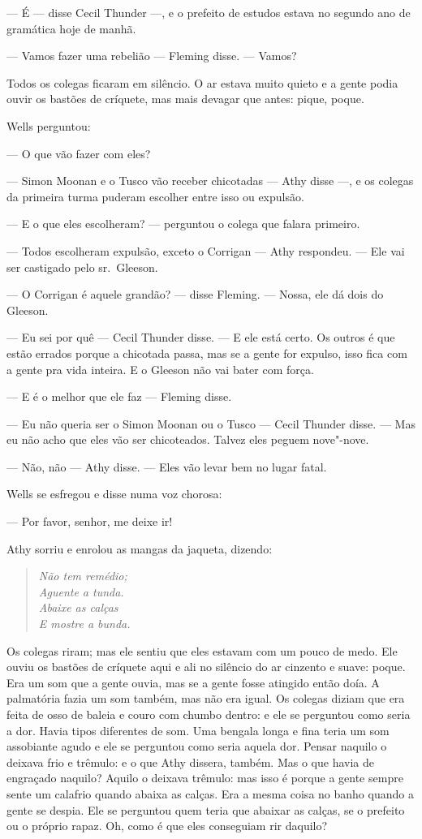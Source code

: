  --- É --- disse Cecil Thunder ---, e o prefeito de estudos estava no segundo ano
de gramática hoje de manhã.

 --- Vamos fazer uma rebelião --- Fleming disse. --- Vamos?

Todos os colegas ficaram em silêncio. O ar estava muito quieto e a gente
podia ouvir os bastões de críquete, mas mais devagar que antes: pique,
poque.

Wells perguntou:

 --- O que vão fazer com eles?

 --- Simon Moonan e o Tusco vão receber chicotadas --- Athy disse ---, e os
colegas da primeira turma puderam escolher entre isso ou expulsão.

 --- E o que eles escolheram? --- perguntou o colega que falara primeiro.

 --- Todos escolheram expulsão, exceto o Corrigan --- Athy respondeu. --- Ele vai
ser castigado pelo sr.~Gleeson.

 --- O Corrigan é aquele grandão? --- disse Fleming. --- Nossa, ele dá dois do
Gleeson.

 --- Eu sei por quê --- Cecil Thunder disse. --- E ele está certo. Os outros é que
estão errados porque a chicotada passa, mas se a gente for expulso,
isso fica com a gente pra vida inteira. E o Gleeson não vai bater com
força.

 --- E é o melhor que ele faz --- Fleming disse.

 --- Eu não queria ser o Simon Moonan ou o Tusco --- Cecil Thunder disse. --- Mas
eu não acho que eles vão ser chicoteados. Talvez eles peguem
nove"-nove.

 --- Não, não --- Athy disse. --- Eles vão levar bem no lugar fatal. 

Wells se esfregou e disse numa voz chorosa:

 --- Por favor, senhor, me deixe ir!

Athy sorriu e enrolou as mangas da jaqueta, dizendo:

\begin{verse}\itshape
Não tem remédio;\\
Aguente a tunda.\\
Abaixe as calças\\
E mostre a bunda.
\end{verse}

Os colegas riram; mas ele sentiu que eles estavam com um pouco de medo.
Ele ouviu os bastões de críquete aqui e ali no silêncio do ar cinzento
e suave: poque. Era um som que a gente ouvia, mas se a gente fosse
atingido então doía. A palmatória fazia um som também, mas não era
igual. Os colegas diziam que era feita de osso de baleia e couro com
chumbo dentro: e ele se perguntou como seria a dor. Havia tipos
diferentes de som. Uma bengala longa e fina teria um som assobiante
agudo e ele se perguntou como seria aquela dor. Pensar naquilo o
deixava frio e trêmulo: e o que Athy dissera, também. Mas o que havia
de engraçado naquilo? Aquilo o deixava trêmulo: mas isso é porque a gente
sempre sente um calafrio quando abaixa as calças. Era a mesma coisa no
banho quando a gente se despia. Ele se perguntou quem teria que abaixar
as calças, se o prefeito ou o próprio rapaz. Oh, como é que eles
conseguiam rir daquilo?

